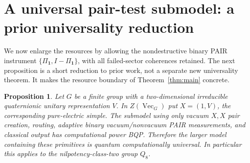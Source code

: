 \documentclass[11pt]{amsart}
\newtheorem{proposition}[theorem]{Proposition}
\theoremstyle{definition}\newtheorem{definition}[theorem]{Definition}
\newcommand{\one}{\mathbf1}
\newcommand{\VEC}{\operatorname{Vec}}
\begin{document}
\section{A universal pair-test submodel: a prior universality reduction}
We now enlarge the resources by allowing the nondestructive binary PAIR
instrument $\{\Pi_{\one},I-\Pi_{\one}\}$, with all failed-sector coherences
retained. The next proposition is a short reduction to prior work, not a
separate new universality theorem. It makes the resource boundary of
Theorem~\ref{thm:main} concrete.

\begin{proposition}\label{prop:binary}
Let $G$ be a finite group with a two-dimensional irreducible quaternionic
unitary representation $V$. In $Z(\VEC_G)$ put $X=(1,V)$, the corresponding
pure-electric simple. The submodel using only vacuum $X,X$ pair creation,
routing, adaptive binary vacuum/nonvacuum PAIR measurements, and classical
output has computational power BQP. Therefore the larger model containing
these primitives is quantum computationally universal. In particular this
applies to the nilpotency-class-two group $Q_8$.
\end{proposition}
\end{document}
